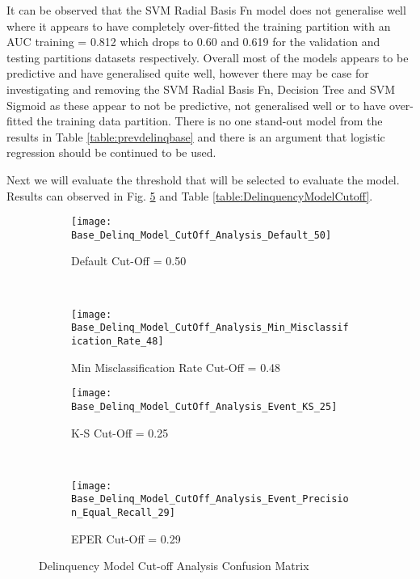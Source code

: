 It can be observed that the SVM Radial Basis Fn model does not generalise well where it appears to have completely over-fitted the training partition with an AUC training = 0.812 which drops to 0.60 and 0.619 for the validation and testing partitions datasets respectively. Overall most of the models appears to be predictive and have generalised quite well, however there may be case for investigating and removing the SVM Radial Basis Fn, Decision Tree and SVM Sigmoid as these appear to not be predictive, not generalised well or to have over-fitted the training data partition. There is no one stand-out model from the results in Table \ref{table:prevdelinqbase} and there is an argument that logistic regression should be continued to be used. 


Next we will evaluate the threshold that will be selected to evaluate the model. Results can observed in Fig. \ref{fig:Base_Delinq_Model_CutOff_Analysis} and Table \ref{table:DelinquencyModelCutoff}. 	

\begin{figure}[H]
	\begin{adjustwidth}{-2cm}{-2cm}
	\centering
	\begin{subfigure}[b]{0.60\textwidth}
		\captionsetup{font=scriptsize}
		\texttt{[image: Base\_Delinq\_Model\_CutOff\_Analysis\_Default\_50]}\caption{Default Cut-Off = 0.50}\label{fig:Base_Delinq_Model_CutOff_Analysis_Default_50}
	\end{subfigure}  ~\quad
	\begin{subfigure}[b]{0.60\textwidth}
		\captionsetup{font=scriptsize}
		\texttt{[image: Base\_Delinq\_Model\_CutOff\_Analysis\_Min\_Misclassification\_Rate\_48]}
		\caption{Min Misclassification Rate Cut-Off = 0.48}\label{fig:Base_Delinq_Model_CutOff_Analysis_Min_Misclassification_Rate_54}
	\end{subfigure} 
	\newline
	\begin{subfigure}[b]{0.60\textwidth}
		\captionsetup{font=scriptsize}
		\texttt{[image: Base\_Delinq\_Model\_CutOff\_Analysis\_Event\_KS\_25]}
		\caption{K-S Cut-Off = 0.25}\label{fig:Base_Delinq_Model_CutOff_Analysis_Event_KS_25}
	\end{subfigure} ~\quad
	\begin{subfigure}[b]{0.60\textwidth}
		\captionsetup{font=scriptsize}
		\texttt{[image: Base\_Delinq\_Model\_CutOff\_Analysis\_Event\_Precision\_Equal\_Recall\_29]}
		\caption{EPER Cut-Off = 0.29}\label{fig:Base_Delinq_Model_CutOff_Analysis_Event_Precision_Equal_Recall_29}
	\end{subfigure}
	\caption{Delinquency Model Cut-off Analysis Confusion Matrix}
	\label{fig:Base_Delinq_Model_CutOff_Analysis}
\end{adjustwidth}
\end{figure}

